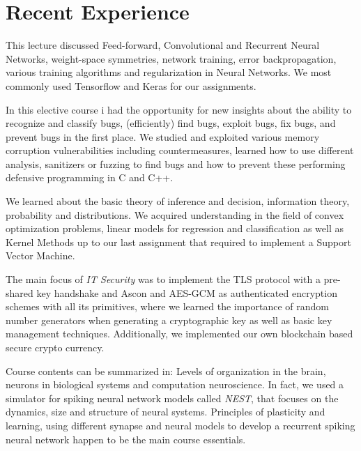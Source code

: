 \documentclass[]{resume}
\begin{document}
\begin{minipage}[t]{0.66\textwidth} 
	\section{Recent Experience} 
	
		This lecture discussed Feed-forward, Convolutional and Recurrent Neural Networks, weight-space symmetries, network training, error backpropagation, various training algorithms and regularization in Neural Networks. We most commonly used Tensorflow and Keras for our assignments. \sectionsep

		In this elective course i had the opportunity for new insights about the ability to recognize and classify bugs, (efficiently) find bugs, exploit bugs, fix bugs, and prevent bugs in the first place. We studied and exploited various memory corruption vulnerabilities including countermeasures, learned how to use different analysis, sanitizers or fuzzing to find bugs and how to prevent these performing defensive programming in C and C++. \sectionsep	

		We learned about the basic theory of inference and decision, information theory, probability and distributions. We acquired understanding in the field of convex optimization problems, linear models for regression and classification as well as Kernel Methods up to our last assignment that required to implement a Support Vector Machine. \sectionsep	
	
		The main focus of \textit{IT Security} was to implement the TLS protocol with a pre-shared key handshake and Ascon and AES-GCM as authenticated encryption schemes with all its primitives, where we learned the importance of random number generators when generating a cryptographic key as well as basic key management techniques. Additionally, we implemented our own blockchain based secure crypto currency. \sectionsep
	
		Course contents can be summarized in: Levels of organization in the brain, neurons in biological systems and computation neuroscience. In fact, we used a simulator for spiking neural network models called \textit{NEST}, that focuses on the dynamics, size and structure of neural systems. Principles of plasticity and learning, using different synapse and neural models to develop a recurrent spiking neural network happen to be the main course essentials. \sectionsep
	

\end{minipage}
\end{document}
